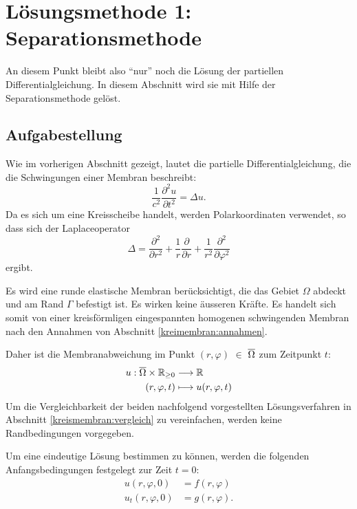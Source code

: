 %
%


\section{Lösungsmethode 1: Separationsmethode 
	\label{kreismembran:section:teil1}}
An diesem Punkt bleibt also ``nur'' noch die Lösung der partiellen Differentialgleichung. In diesem Abschnitt wird sie mit Hilfe der Separationsmethode gelöst.

\subsection{Aufgabestellung\label{sub:aufgabestellung}}
Wie im vorherigen Abschnitt gezeigt, lautet die partielle Differentialgleichung, die die Schwingungen einer Membran beschreibt:
\begin{equation*}
	\frac{1}{c^2}\frac{\partial^2u}{\partial t^2} = \Delta u.
\end{equation*}
Da es sich um eine Kreisscheibe handelt, werden Polarkoordinaten verwendet, so dass sich der Laplaceoperator
\begin{equation*}
	\Delta
	=
	\frac{\partial^2}{\partial r^2}
	+
	\frac1r
	\frac{\partial}{\partial r}
	+
	\frac{1}{r^2}
	\frac{\partial^2}{\partial\varphi^2}
	\label{buch:pde:kreis:laplace}
\end{equation*}
ergibt.

Es wird eine runde elastische Membran berücksichtigt, die das Gebiet $\Omega$ abdeckt und am Rand $\Gamma$ befestigt ist.
Es wirken keine äusseren Kräfte. Es handelt sich somit von einer kreisförmligen eingespannten homogenen schwingenden Membran nach den Annahmen von Abschnitt \ref{kreimembran:annahmen}.

Daher ist die Membranabweichung im Punkt $(r,\varphi)$ $\in$ $\overline{\rm \Omega}$ zum Zeitpunkt $t$:
\begin{align*}
	u: \overline{\rm \Omega} \times \mathbb{R}_{\geq 0} &\longrightarrow \mathbb{R}\\
	(r,\varphi,t) &\longmapsto u(r,\varphi,t)
\end{align*}
Um die Vergleichbarkeit der beiden nachfolgend vorgestellten Lösungsverfahren in Abschnitt \ref{kreismembran:vergleich} zu vereinfachen, werden keine Randbedingungen vorgegeben.

Um eine eindeutige Lösung bestimmen zu können, werden die folgenden Anfangsbedingungen festgelegt zur Zeit $t = \text{0}$:
\begin{align*}
	u(r,\varphi, 0) &= f(r,\varphi)\\
	u_t(r,\varphi, 0) &= g(r,\varphi).
\end{align*}

